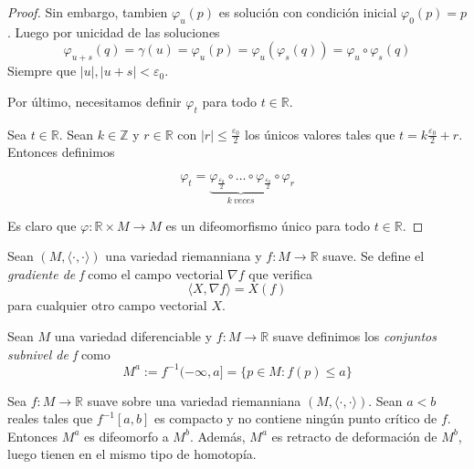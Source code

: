 \begin{proof}
    Sin embargo, tambien $\varphi_u(p)$ es solución con condición inicial $\varphi_0(p)=p$. Luego por unicidad de las soluciones
    \begin{equation*}
        \varphi_{u+s}(q)=\gamma(u)=\varphi_u(p)=\varphi_u(\varphi_s(q))=\varphi_u\circ \varphi_s(q)
    \end{equation*}
    Siempre que $|u|, |u+s|<\varepsilon_0$.

    Por último, necesitamos definir $\varphi_t$ para todo $t\in \mathbb{R}$.

    Sea $t\in \mathbb{R}$. Sean $k\in \mathbb{Z}$ y $r\in \mathbb{R}$ con $|r|\le \frac{\varepsilon_0}{2}$ los únicos valores tales que $t=k\frac{\varepsilon_0}{2}+r$. Entonces definimos

    \begin{equation*}
        \varphi_t=\underbrace{\varphi_{\frac{\varepsilon_0}{2}}\circ \dots \circ \varphi_{\frac{\varepsilon_0}{2}}}_{k~veces}\circ \varphi_r 
    \end{equation*}

    Es claro que $\varphi:\mathbb{R}\times M\to M$ es un difeomorfismo único para todo $t\in \mathbb{R}$.

\end{proof}

\begin{definition}
    Sean $(M,\langle\cdot,\cdot\rangle)$ una variedad riemanniana y $f:M\to\mathbb{R}$ suave. Se define el \textit{gradiente de f} como el campo vectorial $\nabla f$ que verifica 
    \begin{equation*}
        \langle X,\nabla f\rangle = X(f)
    \end{equation*}
    para cualquier otro campo vectorial $X$.
\end{definition}
\bigskip

\begin{definition}
    Sean $M$ una variedad diferenciable y $f:M\to\mathbb{R}$ suave definimos los \textit{conjuntos subnivel de f} como
    \begin{equation*}
        M^a := f^{-1}(-\infty,a] =\{p\in M: f(p)\le a\}
    \end{equation*}
\end{definition}

\begin{theorem}
\label{retractodef}
    Sea $f:M\to\mathbb{R}$ suave sobre una variedad riemanniana $(M,\langle\cdot,\cdot\rangle)$. Sean $a<b$ reales tales que $f^{-1}[a,b]$ es compacto y no contiene ningún punto crítico de $f$. Entonces $M^a$ es difeomorfo a $M^b$. Además, $M^a$ es retracto de deformación de $M^b$, luego tienen en el mismo tipo de homotopía.
\end{theorem}

